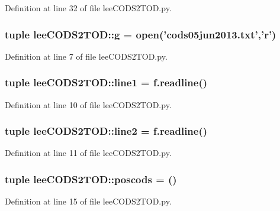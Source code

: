 \-Definition at line 32 of file lee\-C\-O\-D\-S2\-T\-O\-D.\-py.

\subsubsection[{g}]{\setlength{\rightskip}{0pt plus 5cm}tuple {\bf lee\-C\-O\-D\-S2\-T\-O\-D\-::g} = open('cods05jun2013.\-txt','r')}\label{namespacelee_c_o_d_s2_t_o_d_a051f7c8bd96880e125811c42d6a99bf1}


\-Definition at line 7 of file lee\-C\-O\-D\-S2\-T\-O\-D.\-py.

\subsubsection[{line1}]{\setlength{\rightskip}{0pt plus 5cm}tuple {\bf lee\-C\-O\-D\-S2\-T\-O\-D\-::line1} = f.\-readline()}\label{namespacelee_c_o_d_s2_t_o_d_a6820889e577a8ead537dd26d1bc3f5d8}


\-Definition at line 10 of file lee\-C\-O\-D\-S2\-T\-O\-D.\-py.

\subsubsection[{line2}]{\setlength{\rightskip}{0pt plus 5cm}tuple {\bf lee\-C\-O\-D\-S2\-T\-O\-D\-::line2} = f.\-readline()}\label{namespacelee_c_o_d_s2_t_o_d_aa9da18aac2648ee4b8c7128bab915b6d}


\-Definition at line 11 of file lee\-C\-O\-D\-S2\-T\-O\-D.\-py.

\subsubsection[{poscods}]{\setlength{\rightskip}{0pt plus 5cm}tuple {\bf lee\-C\-O\-D\-S2\-T\-O\-D\-::poscods} = ()}\label{namespacelee_c_o_d_s2_t_o_d_a6e8af16ef718dcba41b65542a5300627}


\-Definition at line 15 of file lee\-C\-O\-D\-S2\-T\-O\-D.\-py.

